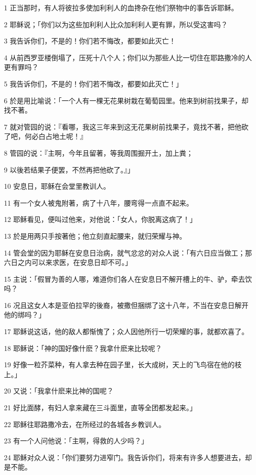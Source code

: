 \par 1 正当那时，有人将彼拉多使加利利人的血搀杂在他们祭物中的事告诉耶稣。
\par 2 耶稣说；「你们以为这些加利利人比众加利利人更有罪，所以受这害吗？
\par 3 我告诉你们，不是的！你们若不悔改，都要如此灭亡！
\par 4 从前西罗亚楼倒塌了，压死十八个人；你们以为那些人比一切住在耶路撒冷的人更有罪吗？
\par 5 我告诉你们，不是的！你们若不悔改，都要如此灭亡！」
\par 6 於是用比喻说：「一个人有一棵无花果树栽在葡萄园里。他来到树前找果子，却找不著。
\par 7 就对管园的说：『看哪，我这三年来到这无花果树前找果子，竟找不著，把他砍了吧，何必白占地土呢！』
\par 8 管园的说：『主啊，今年且留著，等我周围掘开土，加上粪；
\par 9 以後若结果子便罢，不然再把他砍了。』」
\par 10 安息日，耶稣在会堂里教训人。
\par 11 有一个女人被鬼附著，病了十八年，腰弯得一点直不起来。
\par 12 耶稣看见，便叫过他来，对他说：「女人，你脱离这病了！」
\par 13 於是用两只手按著他；他立刻直起腰来，就归荣耀与神。
\par 14 管会堂的因为耶稣在安息日治病，就气忿忿的对众人说：「有六日应当做工；那六日之内可以来求医，在安息日却不可。」
\par 15 主说：「假冒为善的人哪，难道你们各人在安息日不解开槽上的牛、驴，牵去饮吗？
\par 16 况且这女人本是亚伯拉罕的後裔，被撒但捆绑了这十八年，不当在安息日解开他的绑吗？」
\par 17 耶稣说这话，他的敌人都惭愧了；众人因他所行一切荣耀的事，就都欢喜了。
\par 18 耶稣说：「神的国好像什麽？我拿什麽来比较呢？
\par 19 好像一粒芥菜种，有人拿去种在园子里，长大成树，天上的飞鸟宿在他的枝上。」
\par 20 又说：「我拿什麽来比神的国呢？
\par 21 好比面酵，有妇人拿来藏在三斗面里，直等全团都发起来。」
\par 22 耶稣往耶路撒冷去，在所经过的各城各乡教训人。
\par 23 有一个人问他说：「主啊，得救的人少吗？」
\par 24 耶稣对众人说：「你们要努力进窄门。我告诉你们，将来有许多人想要进去，却是不能。
